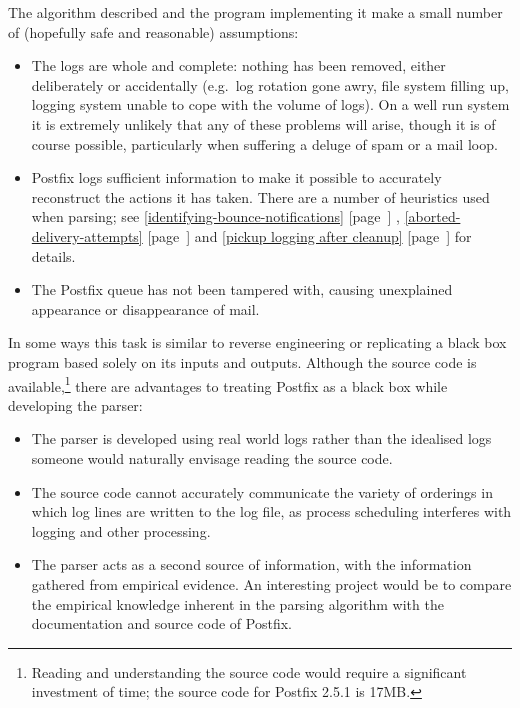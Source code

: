 \documentclass[a4paper,12pt,draft]{article}
\newcommand{\refwithpage}[1]{%
    \empty{}\ref{#1} [page~\pageref{#1}]%
}
\newcommand{\sectionref}[1]{%
    \textsection{}\refwithpage{#1}%
}
\begin{document}
The algorithm described and the program implementing it make a small number
of (hopefully safe and reasonable) assumptions:

\begin{itemize}

    \item The logs are whole and complete: nothing has been removed, either
        deliberately or accidentally (e.g.\ log rotation gone awry, file
        system filling up, logging system unable to cope with the volume of
        logs).  On a well run system it is extremely unlikely that any of
        these problems will arise, though it is of course possible,
        particularly when suffering a deluge of spam or a mail loop.

    \item Postfix logs sufficient information to make it possible to
        accurately reconstruct the actions it has taken.  There are a
        number of heuristics used when parsing; see
        \sectionref{identifying-bounce-notifications},
        \sectionref{aborted-delivery-attempts} and \sectionref{pickup
        logging after cleanup} for details.

    \item The Postfix queue has not been tampered with, causing unexplained
        appearance or disappearance of mail.

\end{itemize}

In some ways this task is similar to reverse engineering or replicating a
black box program based solely on its inputs and outputs.  Although the
source code is available,\footnote{Reading and understanding the source
code would require a significant investment of time; the source code for
Postfix 2.5.1 is 17MB.} there are advantages to treating Postfix as a black
box while developing the parser:

\begin{itemize}

    \item The parser is developed using real world logs rather than the
        idealised logs someone would naturally envisage reading the source
        code.

    \item The source code cannot accurately communicate the variety of
        orderings in which log lines are written to the log file, as
        process scheduling interferes with logging and other processing.

    \item The parser acts as a second source of information, with the
        information gathered from empirical evidence.  An interesting
        project would be to compare the empirical knowledge inherent in the
        parsing algorithm with the documentation and source code of
        Postfix.

\end{itemize}
\end{document}

